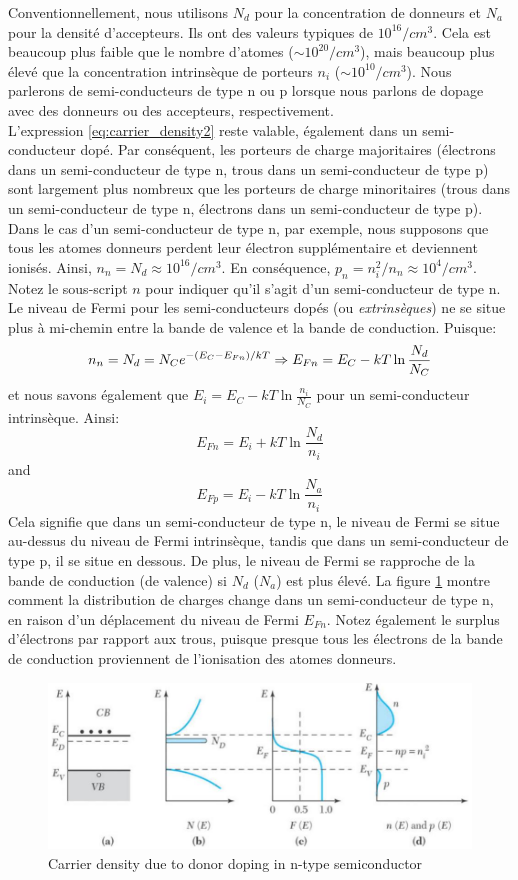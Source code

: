 Conventionnellement, nous utilisons $N_d$ pour la concentration de donneurs et $N_a$ pour la densité d'accepteurs. Ils ont des valeurs typiques de $10^{16}/cm^3$. Cela est beaucoup plus faible que le nombre d'atomes ($\sim 10^{20}/cm^3$), mais beaucoup plus élevé que la concentration intrinsèque de porteurs $n_i$ ($\sim 10^{10}/cm^3$). Nous parlerons de semi-conducteurs de type n ou p lorsque nous parlons de dopage avec des donneurs ou des accepteurs, respectivement.\\
L'expression \ref{eq:carrier_density2} reste valable, également dans un semi-conducteur dopé. Par conséquent, les porteurs de charge majoritaires (électrons dans un semi-conducteur de type n, trous dans un semi-conducteur de type p) sont largement plus nombreux que les porteurs de charge minoritaires (trous dans un semi-conducteur de type n, électrons dans un semi-conducteur de type p). Dans le cas d'un semi-conducteur de type n, par exemple, nous supposons que tous les atomes donneurs perdent leur électron supplémentaire et deviennent ionisés. Ainsi, $n_n = N_d \approx 10^{16}/cm^3$. En conséquence, $p_n = n_i^2/n_n \approx 10^{4}/cm^3$. Notez le sous-script $n$ pour indiquer qu'il s'agit d'un semi-conducteur de type n.\\
Le niveau de Fermi pour les semi-conducteurs dopés (ou \emph{extrinsèques}) ne se situe plus à mi-chemin entre la bande de valence et la bande de conduction. Puisque:
$$
n_n = N_d =  N_C e^{-(E_C-E_{Fn})/kT}\Rightarrow E_{Fn} = E_C - kT \ln \frac{N_d}{N_C} \\
$$
et nous savons également que $E_{i} = E_C - kT \ln \frac{n_i}{N_C}$ pour un semi-conducteur intrinsèque. Ainsi:
$$
E_{Fn} = E_{i} + kT \ln \frac{N_d}{n_i}
$$
and 
$$
E_{Fp} = E_{i} - kT \ln \frac{N_a}{n_i}
$$
Cela signifie que dans un semi-conducteur de type n, le niveau de Fermi se situe au-dessus du niveau de Fermi intrinsèque, tandis que dans un semi-conducteur de type p, il se situe en dessous. De plus, le niveau de Fermi se rapproche de la bande de conduction (de valence) si $N_d$ ($N_a$) est plus élevé. La figure \ref{fig:doping2} montre comment la distribution de charges change dans un semi-conducteur de type n, en raison d'un déplacement du niveau de Fermi $E_{Fn}$. Notez également le surplus d'électrons par rapport aux trous, puisque presque tous les électrons de la bande de conduction proviennent de l'ionisation des atomes donneurs.
\begin{figure}[h!]
\centering
\includegraphics[width=13cm]{figures/ch01/doping2.jpg}
\caption{Carrier density due to donor doping in n-type semiconductor} 
\label{fig:doping2}
\end{figure}


